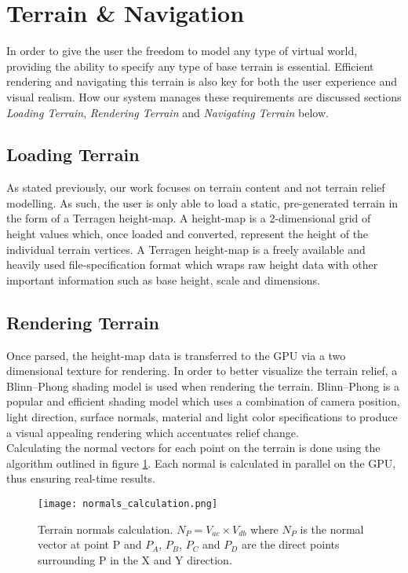 \section{Terrain \& Navigation}

In order to give the user the freedom to model any type of virtual world, providing the ability to specify any type of base terrain is essential. Efficient rendering and navigating this terrain is also key for both the user experience and visual realism. How our system manages these requirements are discussed sections \textit{Loading Terrain}, \textit{Rendering Terrain} and \textit{Navigating Terrain} below.

\subsection{Loading Terrain}

As stated previously, our work focuses on terrain content and not terrain relief modelling. As such, the user is only able to load a static, pre-generated terrain in the form of a Terragen height-map. A height-map is a 2-dimensional grid of height values which, once loaded and converted, represent the height of the individual terrain vertices. A Terragen height-map is a freely available and heavily used file-specification format which wraps raw height data with other important information such as base height, scale and dimensions.

\subsection{Rendering Terrain}

Once parsed, the height-map data is transferred to the GPU via a two dimensional texture for rendering. In order to better visualize the terrain relief, a Blinn–Phong shading model is used when rendering the terrain. Blinn–Phong is a popular and efficient shading model which uses a combination of camera position, light direction, surface normals, material and light color specifications to produce a visual appealing rendering which accentuates relief change.\\
Calculating the normal vectors for each point on the terrain is done using the algorithm outlined in figure \ref{fig:normals_calculation}. Each normal is calculated in parallel on the GPU, thus ensuring real-time results.

\begin{figure}[h]
\center
	\texttt{[image: normals\_calculation.png]}
	\caption{Terrain normals calculation. $N_{P} = V_{ac} \times V_{db} $ where $N_{P}$ is the normal vector at point P and $P_{A}$, $P_{B}$, $P_{C}$ and $P_{D}$ are the direct points surrounding P in the X and Y direction. }
	\label{fig:normals_calculation}
\end{figure}

